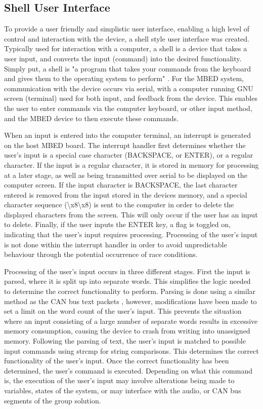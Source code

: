 \subsection*{Shell User Interface}

To provide a user friendly and simplistic user interface, enabling a high level 
of control and interaction with the device, a shell style user interface was 
created. 
Typically used for interaction with a computer, a shell is a device that takes 
a user input, and converts the input (command) into the desired functionality. 
Simply put, a shell is "a program that takes your commands from the keyboard and 
gives them to the operating system to perform" \cite{shell-def}.
For the MBED system, communication with the device occurs via serial, with a 
computer running GNU screen (terminal) used for both input, and feedback from 
the device. 
This enables the user to enter commands via the computer keyboard, or other input
method, and the MBED device to then execute these commands. 
\par\bigskip\noindent
When an input is entered into the computer terminal, an interrupt is generated
on the host MBED board. 
The interrupt handler first determines whether the user's input is a special case 
character (BACKSPACE, or ENTER), or a regular character. 
If the input is a regular character, it is stored in memory for processing at a 
later stage, as well as being transmitted over serial to be displayed on the 
computer screen. 
If the input character is BACKSPACE, the last character entered is removed from 
the input stored in the devices memory, and a special character sequence (\textbackslash x8\textbackslash x8)
is sent to the computer in order to delete the displayed characters from the 
screen. This will only occur if the user has an input to delete.
Finally, if the user inputs the ENTER key, a flag is toggled on, indicating that 
the user's input requires processing. Processing of the user's input is not done 
within the interrupt handler in order to avoid unpredictable behaviour through 
the potential occurrence of race conditions.  
\par\bigskip\noindent
Processing of the user's input occurs in three different stages. 
First the input is parsed, where it is split up into separate words. This 
simplifies the logic needed to determine the correct functionality to perform.
Parsing is done using a similar method as the CAN bus text packets \cite{text-parser}, 
however, modifications have been made to set a limit on the word count of the 
user's input. This prevents the situation where an input consisting of a large 
number of separate words results in excessive memory consumption, causing 
the device to crash from writing into unassigned memory. 
Following the parsing of text, the user's input is matched to possible input 
commands using strcmp for string comparisons. This determines the correct 
functionality of the user's input. 
Once the correct functionality has been determined, the user's command is executed. 
Depending on what this command is, the execution of the user's input may involve 
alterations being made to variables, states of the system, or may interface with 
the audio, or CAN bus segments of the group solution. 

